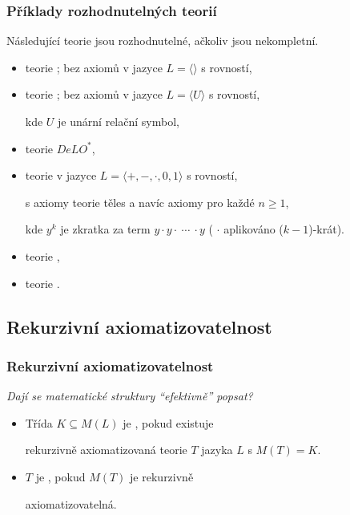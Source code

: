 \subsubsection*{Příklady rozhodnutelných teorií}
Následující teorie jsou rozhodnutelné, ačkoliv jsou nekompletní.
\smallskip

\begin{itemize}
\item teorie ; bez axiomů v jazyce $L=\langle \rangle$ s rovností,
\smallskip

\item teorie ; bez axiomů v jazyce $L=\langle U \rangle$ s rovností,
\smallskip

kde $U$ je unární relační symbol,
\smallskip

\item teorie  $DeLO^*$,
\smallskip

\item teorie  v jazyce $L=\langle +,-,\cdot,0,1\rangle$ s rovností,
\smallskip

s axiomy teorie těles a navíc axiomy pro každé $n\ge 1$,



kde $y^k$ je zkratka za term $y\cdot y \cdot\ \dotsb\ \cdot y$ ( $\cdot$ aplikováno ($k-1$)-krát).
\smallskip

\item teorie ,
\smallskip

\item teorie .
\end{itemize}


\subsection{Rekurzivní axiomatizovatelnost}\todo

\subsubsection*{Rekurzivní axiomatizovatelnost}
    {\it Dají se matematické struktury ``efektivně'' popsat?}
    \smallskip
    
    \begin{itemize}
    \item Třída $K\subseteq M(L)$ je , pokud existuje
    \smallskip
    
    rekurzivně axiomatizovaná teorie $T$ jazyka $L$ s $M(T)=K$.
    \smallskip
    
    \item {} $T$ je , pokud $M(T)$ je
    rekurzivně
    \smallskip
    
    axiomatizovatelná.
    \end{itemize}
    
